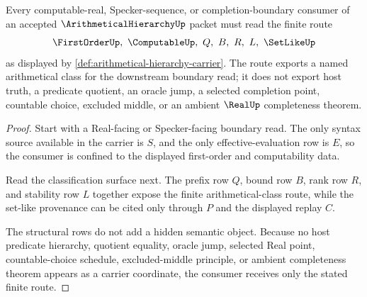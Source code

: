 \begin{theorem}
\label{thm:arithmetical-hierarchy-computable-real-boundary-handoff}
Every computable-real, Specker-sequence, or completion-boundary consumer of an accepted $\ArithmeticalHierarchyUp$ packet must read the finite route
$$
\FirstOrderUp,\ \ComputableUp,\ Q,\ B,\ R,\ L,\ \SetLikeUp
$$
as displayed by \autoref{def:arithmetical-hierarchy-carrier}. The route exports a named arithmetical class for the downstream boundary read; it does not export host truth, a predicate quotient, an oracle jump, a selected completion point, countable choice, excluded middle, or an ambient $\RealUp$ completeness theorem.
\end{theorem}
\begin{proof}
Start with a Real-facing or Specker-facing boundary read. The only syntax source available in the carrier is $S$, and the only effective-evaluation row is $E$, so the consumer is confined to the displayed first-order and computability data.

Read the classification surface next. The prefix row $Q$, bound row $B$, rank row $R$, and stability row $L$ together expose the finite arithmetical-class route, while the set-like provenance can be cited only through $P$ and the displayed replay $C$.

The structural rows do not add a hidden semantic object. Because no host predicate hierarchy, quotient equality, oracle jump, selected Real point, countable-choice schedule, excluded-middle principle, or ambient completeness theorem appears as a carrier coordinate, the consumer receives only the stated finite route.
\end{proof}




